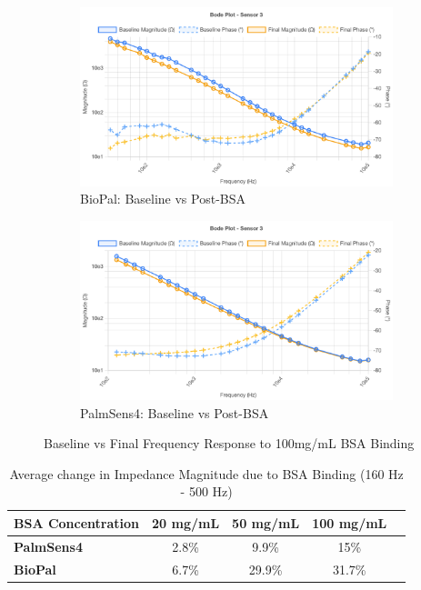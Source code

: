 \begin{figure}[H]
    \centering
    \begin{subfigure}{0.48\textwidth}
        \includegraphics[width=\textwidth]{10g-100mL BioPal.png}   
        \caption{BioPal: Baseline vs Post-BSA}
        \label{fig:10g_biopal}
    \end{subfigure}
    \hfill
    \begin{subfigure}{0.48\textwidth}
        \includegraphics[width=\textwidth]{PalmSens10g.png}
        \caption{PalmSens4: Baseline vs Post-BSA}
        \label{fig:10g_palmsens}
    \end{subfigure}
    \caption{Baseline vs Final Frequency Response to 100mg/mL BSA Binding}
    \label{fig:10g_bsa_comparison_final}
\end{figure}

\begin{table}[H]
\centering
\caption{Average change in Impedance Magnitude due to BSA Binding (160 Hz - 500 Hz)}
\label{tab:risk_levels}
\begin{tabular}{lcccc}
\hline
\textbf{BSA Concentration} & \textbf{20 mg/mL} & \textbf{50 mg/mL} & \textbf{100 mg/mL} \\
\hline
\textbf{PalmSens4} & 2.8\% & 9.9\% & 15\% \\
\textbf{BioPal} & 6.7\% & 29.9\% & 31.7\% \\
\hline
\end{tabular}
\end{table}

